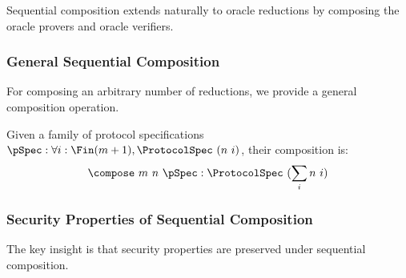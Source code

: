 \begin{definition}
    \label{def:oracle_reduction_append}
    Sequential composition extends naturally to oracle reductions by composing the oracle provers and oracle verifiers.
\end{definition}

\subsubsection{General Sequential Composition}

For composing an arbitrary number of reductions, we provide a general composition operation.

\begin{definition}
    \label{def:protocol_spec_compose}
    Given a family of protocol specifications $\pSpec : \forall i : \Fin(m+1), \ProtocolSpec\ (n\ i)$, their composition is:
    \[ \compose\ m\ n\ \pSpec : \ProtocolSpec\ (\sum_{i} n\ i) \]
\end{definition}

\begin{definition}
    \label{def:prover_compose}
\end{definition}

\begin{definition}
    \label{def:verifier_compose}
\end{definition}

\begin{definition}
    \label{def:reduction_compose}
\end{definition}

\subsubsection{Security Properties of Sequential Composition}

The key insight is that security properties are preserved under sequential composition.

